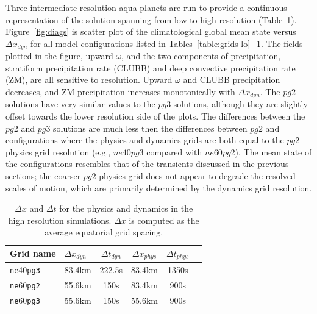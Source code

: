 \documentclass{agujournal}
\begin{document}
Three intermediate resolution aqua-planets are run to provide a continuous representation of the solution spanning from low to high resolution (Table~\ref{table:grids-med}). Figure~\ref{fig:diags} is scatter plot of the climatological global mean state versus $\Delta x_{dyn}$ for all model configurations listed in Tables~\ref{table:grids-lo}$-$\ref{table:grids-med}. The fields plotted in the figure, upward $\omega$, and the two components of precipitation, stratiform precipitation rate (CLUBB) and deep convective precipitation rate (ZM), are all sensitive to resolution. Upward $\omega$ and CLUBB precipitation decreases, and ZM precipitation increases monotonically with $\Delta x_{dyn}$. The $pg2$ solutions have very similar values to the $pg3$ solutions, although they are slightly offset towards the lower resolution side of the plots. The differences between the $pg2$ and $pg3$ solutions are much less then the differences between $pg2$ and configurations where the physics and dynamics grids are both equal to the $pg2$ physics grid resolution (e.g., $ne40pg3$ compared with $ne60pg2$). The mean state of the configurations resembles that of the transients discussed in the previous sections; the coarser $pg2$ physics grid does not appear to degrade the resolved scales of motion, which are primarily determined by the dynamics grid resolution.

 \begin{table}
 \caption{$\Delta x$ and $\Delta t$ for the physics and dynamics in the high resolution simulations. $\Delta x$ is computed as the average equatorial grid spacing.}
 \centering
 \begin{tabular}{llcccc}
 \hline
 Grid name & $\Delta x_{dyn}$  & $\Delta t_{dyn}$ & $\Delta x_{phys}$  & $\Delta t_{phys}$ \\
 \hline
   {\tt{ne}}40{\tt{pg3}}  & 83.4km & 222.5s  & 83.4km & 1350s \\
   {\tt{ne}}60{\tt{pg2}}  & 55.6km & 150s  & 83.4km & 900s \\
   {\tt{ne}}60{\tt{pg3}}  & 55.6km & 150s  & 55.6km & 900s \\
 \hline
 \end{tabular}
 \label{table:grids-med}
 \end{table}
\end{document}
